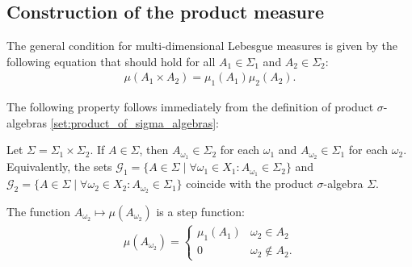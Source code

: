 \subsection{Construction of the product measure}

    The general condition for multi-dimensional Lebesgue measures is given by the following equation that should hold for all $A_1\in\Sigma_1$ and $A_2\in\Sigma_2$:
    \begin{gather}
        \label{lebesgue:general_condition}
        \mu(A_1\times A_2) = \mu_1(A_1)\mu_2(A_2).
    \end{gather}

    The following property follows immediately from the definition of product $\sigma$-algebras \ref{set:product_of_sigma_algebras}:
    \begin{property}
        Let $\Sigma = \Sigma_1\times\Sigma_2$. If $A\in\Sigma$, then $A_{\omega_1}\in\Sigma_2$ for each $\omega_1$ and $A_{\omega_2}\in\Sigma_1$ for each $\omega_2$. Equivalently, the sets $\mathcal{G}_1 = \{A\in\Sigma\mid\forall\omega_1\in X_1:A_{\omega_1}\in\Sigma_2\}$ and $\mathcal{G}_2 = \{A\in\Sigma\mid\forall\omega_2\in X_2: A_{\omega_2}\in\Sigma_1\}$ coincide with the product $\sigma$-algebra $\Sigma$.
    \end{property}

    \begin{property}
        The function $A_{\omega_2}\mapsto\mu(A_{\omega_2})$ is a step function:
        \begin{gather*}
            \mu(A_{\omega_2}) =
            \begin{cases}
                \mu_1(A_1)&\omega_2\in A_2\\
                0&\omega_2\not\in A_2.
            \end{cases}
        \end{gather*}
    \end{property}

